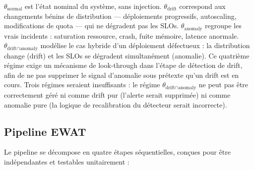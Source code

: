 $\theta_\text{normal}$ est l'état nominal du système, sans injection.
$\theta_\text{drift}$ correspond aux changements bénins de distribution --- déploiements
progressifs, autoscaling, modifications de quota --- qui ne dégradent pas les SLOs.
$\theta_\text{anomaly}$ regroupe les vrais incidents : saturation ressource, crash, fuite
mémoire, latence anormale.
$\theta_{\text{drift} \cap \text{anomaly}}$ modélise le cas hybride d'un déploiement
défectueux : la distribution change (drift) et les SLOs se dégradent simultanément (anomalie).
Ce quatrième régime exige un mécanisme de look-through dans l'étape de détection de drift,
afin de ne pas supprimer le signal d'anomalie sous prétexte qu'un drift est en cours.
Trois régimes seraient insuffisants : le régime $\theta_{\text{drift} \cap \text{anomaly}}$
ne peut pas être correctement géré ni comme drift pur (l'alerte serait supprimée)
ni comme anomalie pure (la logique de recalibration du détecteur serait incorrecte).

\subsection{Pipeline EWAT}
\label{sec:pipeline_overview}

Le pipeline se décompose en quatre étapes séquentielles, conçues pour être indépendantes
et testables unitairement :

